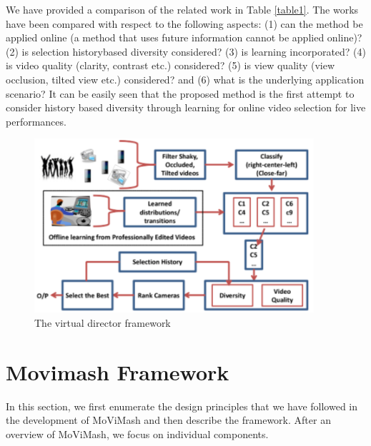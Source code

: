 \documentclass{sig-alternate}
\begin{document}
We have provided a comparison of the related work in Table \ref{table1}.
The works have been compared with respect to the following aspects:
(1) can the method be applied online (a method that uses future
information cannot be applied online)? (2) is selection historybased
diversity considered? (3) is learning incorporated? (4) is
video quality (clarity, contrast etc.) considered? (5) is view quality
(view occlusion, tilted view etc.) considered? and (6) what is the
underlying application scenario? It can be easily seen that the proposed
method is the first attempt to consider history based diversity
through learning for online video selection for live performances.

\begin{figure}
    \centering
    \includegraphics{img2.png}
    \caption{The virtual director framework}
    \label{fig:fig2}
\end{figure}

\section{Movimash Framework}\label{framework}
In this section, we first enumerate the design principles that we have followed in the development of MoViMash and then describe the framework. After an overview of MoViMash, we focus on individual components.
\end{document}
